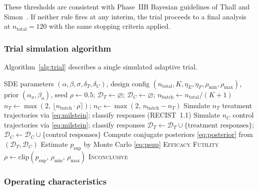\documentclass[11pt,a4paper]{article}
\newcommand{\psup}{p_{\text{sup}}}
\newcommand{\etaE}{\eta_E}
\newcommand{\etaF}{\eta_F}
\begin{document}
These thresholds are consistent with Phase~IIB Bayesian guidelines of Thall and
Simon~\cite{Thall1994}. If neither rule fires at any interim, the trial proceeds
to a final analysis at $n_{\text{total}} = 120$ with the same stopping criteria
applied.
 
\subsubsection{Trial simulation algorithm}
 
Algorithm~\ref{alg:trial} describes a single simulated adaptive trial.
 
\begin{algorithm}[h]
\caption{Single adaptive trial simulation}
\label{alg:trial}
\begin{algorithmic}[1]
\Require SDE parameters $(\alpha, \beta, \sigma, \delta_T, \delta_C)$,
         design config $(n_{\text{total}}, K, \etaE, \etaF, \rho_{\min}, \rho_{\max})$,
         prior $(\alpha_a, \beta_a)$, seed
\State $\rho \leftarrow 0.5$; \;
       $\mathcal{D}_T \leftarrow \varnothing$; \;
       $\mathcal{D}_C \leftarrow \varnothing$; \;
       $n_{\text{batch}} \leftarrow n_{\text{total}} / (K+1)$
  \State $n_T \leftarrow \max(2,\, \lfloor n_{\text{batch}} \cdot \rho \rceil)$;\;
         $n_C \leftarrow \max(2,\, n_{\text{batch}} - n_T)$
  \State Simulate $n_T$ treatment trajectories via \eqref{eq:milstein};
         classify responses (RECIST~1.1)
  \State Simulate $n_C$ control trajectories via \eqref{eq:milstein};
         classify responses
  \State $\mathcal{D}_T \leftarrow \mathcal{D}_T \cup \{\text{treatment responses}\}$;\;
         $\mathcal{D}_C \leftarrow \mathcal{D}_C \cup \{\text{control responses}\}$
  \State Compute conjugate posteriors \eqref{eq:posterior} from
         $(\mathcal{D}_T, \mathcal{D}_C)$
  \State Estimate $\psup$ by Monte Carlo \eqref{eq:psup}
  \If{$\psup > \etaE$} \Return \textsc{Efficacy} \EndIf
  \If{$\psup < \etaF$} \Return \textsc{Futility} \EndIf
    \State $\rho \leftarrow \mathrm{clip}(\psup,\, \rho_{\min},\, \rho_{\max})$
  \EndIf
\EndFor
\State \Return \textsc{Inconclusive}
\end{algorithmic}
\end{algorithm}
 
\subsubsection{Operating characteristics}
 
\end{document}
